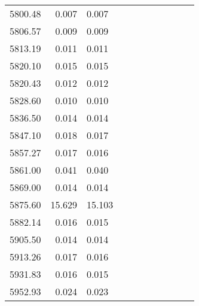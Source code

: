 \begin{longtable}{lrlrlllllll}
 5800.48 &   0.007 &   0.007                                                                                      \\
 5806.57 &   0.009 &   0.009                                                                                      \\
 5813.19 &   0.011 &   0.011                                                                                      \\
 5820.10 &   0.015 &   0.015                                                                                      \\
 5820.43 &   0.012 &   0.012                                                                                      \\
 5828.60 &   0.010 &   0.010                                                                                      \\
 5836.50 &   0.014 &   0.014                                                                                      \\
 5847.10 &   0.018 &   0.017                                                                                      \\
 5857.27 &   0.017 &   0.016                                                                                      \\
 5861.00 &   0.041 &   0.040                                                                                      \\
 5869.00 &   0.014 &   0.014                                                                                      \\
 5875.60 &  15.629 &  15.103                                                                                      \\
 5882.14 &   0.016 &   0.015                                                                                      \\
 5905.50 &   0.014 &   0.014                                                                                      \\
 5913.26 &   0.017 &   0.016                                                                                      \\
 5931.83 &   0.016 &   0.015                                                                                      \\
 5952.93 &   0.024 &   0.023                                                                                      \\

\end{longtable}
